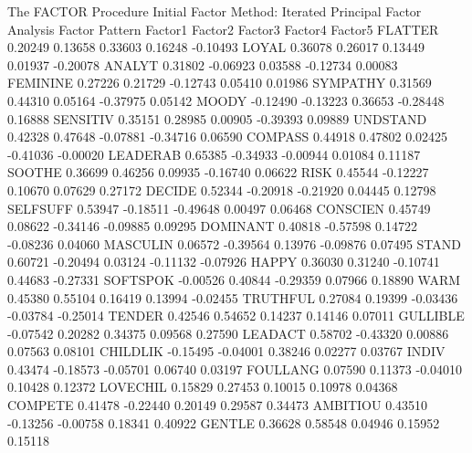 \documentclass{article}
\begin{document}
\begin{Woutput}
The FACTOR Procedure
Initial Factor Method: Iterated Principal Factor Analysis
                                     Factor Pattern
                 Factor1         Factor2         Factor3         Factor4         Factor5
FLATTER          0.20249         0.13658         0.33603         0.16248        -0.10493
LOYAL            0.36078         0.26017         0.13449         0.01937        -0.20078
ANALYT           0.31802        -0.06923         0.03588        -0.12734         0.00083
FEMININE         0.27226         0.21729        -0.12743         0.05410         0.01986
SYMPATHY         0.31569         0.44310         0.05164        -0.37975         0.05142
MOODY           -0.12490        -0.13223         0.36653        -0.28448         0.16888
SENSITIV         0.35151         0.28985         0.00905        -0.39393         0.09889
UNDSTAND         0.42328         0.47648        -0.07881        -0.34716         0.06590
COMPASS          0.44918         0.47802         0.02425        -0.41036        -0.00020
LEADERAB         0.65385        -0.34933        -0.00944         0.01084         0.11187
SOOTHE           0.36699         0.46256         0.09935        -0.16740         0.06622
RISK             0.45544        -0.12227         0.10670         0.07629         0.27172
DECIDE           0.52344        -0.20918        -0.21920         0.04445         0.12798
SELFSUFF         0.53947        -0.18511        -0.49648         0.00497         0.06468
CONSCIEN         0.45749         0.08622        -0.34146        -0.09885         0.09295
DOMINANT         0.40818        -0.57598         0.14722        -0.08236         0.04060
MASCULIN         0.06572        -0.39564         0.13976        -0.09876         0.07495
STAND            0.60721        -0.20494         0.03124        -0.11132        -0.07926
HAPPY            0.36030         0.31240        -0.10741         0.44683        -0.27331
SOFTSPOK        -0.00526         0.40844        -0.29359         0.07966         0.18890
WARM             0.45380         0.55104         0.16419         0.13994        -0.02455
TRUTHFUL         0.27084         0.19399        -0.03436        -0.03784        -0.25014
TENDER           0.42546         0.54652         0.14237         0.14146         0.07011
GULLIBLE        -0.07542         0.20282         0.34375         0.09568         0.27590
LEADACT          0.58702        -0.43320         0.00886         0.07563         0.08101
CHILDLIK        -0.15495        -0.04001         0.38246         0.02277         0.03767
INDIV            0.43474        -0.18573        -0.05701         0.06740         0.03197
FOULLANG         0.07590         0.11373        -0.04010         0.10428         0.12372
LOVECHIL         0.15829         0.27453         0.10015         0.10978         0.04368
COMPETE          0.41478        -0.22440         0.20149         0.29587         0.34473
AMBITIOU         0.43510        -0.13256        -0.00758         0.18341         0.40922
GENTLE           0.36628         0.58548         0.04946         0.15952         0.15118


\end{Woutput}
\end{document}
